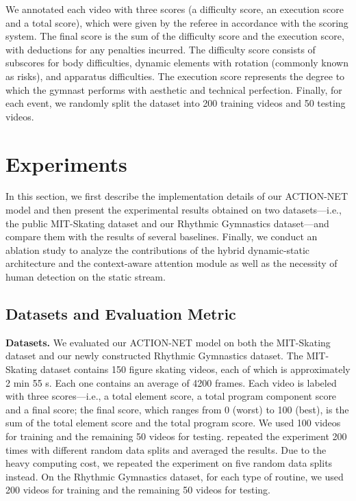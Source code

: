 \documentclass[sigconf]{acmart}
\begin{document}
\vspace{5pt}

 We annotated each video with three scores (a difficulty score, an execution score and a total score), which were given by the referee in accordance with the scoring system. The final score is the sum of the difficulty score and the execution score, with deductions for any penalties incurred. The difficulty score consists of subscores for body difficulties, dynamic elements with rotation (commonly known as risks), and apparatus difficulties. The execution score represents the degree to which the gymnast performs with aesthetic and technical perfection. Finally, for each event, we randomly split the dataset into 200 training videos and 50 testing videos.

\vspace{-0.1cm}

\section{Experiments}

In this section, we first describe the implementation details of our ACTION-NET model and then present the experimental results obtained on two datasets---i.e., the public MIT-Skating dataset and our Rhythmic Gymnastics dataset---and compare them with the results of several baselines. Finally, we conduct an ablation study to analyze the contributions of the hybrid dynamic-static architecture and the context-aware attention module as well as the necessity of human detection on the static stream.

\vspace{-0.1cm}

\subsection{Datasets and Evaluation Metric}

\textbf{Datasets.} We evaluated our ACTION-NET model on both the MIT-Skating dataset \cite{pirsiavash2014assessing} and our newly constructed Rhythmic Gymnastics dataset. The MIT-Skating dataset contains 150 figure skating videos, each of which is approximately 2 min 55 s. Each one contains an average of 4200 frames. Each video is labeled with three scores---i.e., a total element score, a total program component score and a final score; the final score, which ranges from 0 (worst) to 100 (best), is the sum of the total element score and the total program score. We used 100 videos for training and the remaining 50 videos for testing. \cite{parmar2016measuring,parmar2017learning} repeated the experiment 200 times with different random data splits and averaged the results. Due to the heavy computing cost, we repeated the experiment on five random data splits instead. On the Rhythmic Gymnastics dataset, for each type of routine, we used 200 videos for training and the remaining 50 videos for testing.
\end{document}

